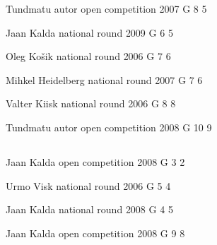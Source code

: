 \documentclass[11pt]{article}
\begin{document}
\ylDisplay{} %
{Tundmatu autor} %
{open competition} %
{2007} %
{G 8} %
{5} %
{

\ifEngStatement
\fi
}

\ylDisplay{} %
{Jaan Kalda} %
{national round} %
{2009} %
{G 6} %
{5} %
{

\ifEngStatement
\fi
}

\ylDisplay{} %
{Oleg Košik} %
{national round} %
{2006} %
{G 7} %
{6} %
{

\ifEngStatement
\fi
}

\ylDisplay{} %
{Mihkel Heidelberg} %
{national round} %
{2007} %
{G 7} %
{6} %
{

\ifEngStatement
\fi
}

\ylDisplay{} %
{Valter Kiisk} %
{national round} %
{2006} %
{G 8} %
{8} %
{

\ifEngStatement
\fi
}

\ylDisplay{} %
{Tundmatu autor} %
{open competition} %
{2008} %
{G 10} %
{9} %
{

\ifEngStatement
\fi
}
\newpage\subsection{\protect{}}

\ylDisplay{} %
{Jaan Kalda} %
{open competition} %
{2008} %
{G 3} %
{2} %
{

\ifEngStatement
\fi
}

\ylDisplay{} %
{Urmo Visk} %
{national round} %
{2006} %
{G 5} %
{4} %
{

\ifEngStatement
\fi
}

\ylDisplay{} %
{Jaan Kalda} %
{national round} %
{2008} %
{G 4} %
{5} %
{

\ifEngStatement
\fi
}

\ylDisplay{} %
{Jaan Kalda} %
{open competition} %
{2008} %
{G 9} %
{8} %
{

\ifEngStatement
\fi
}
\newpage\subsection{\protect{}}
\end{document}
